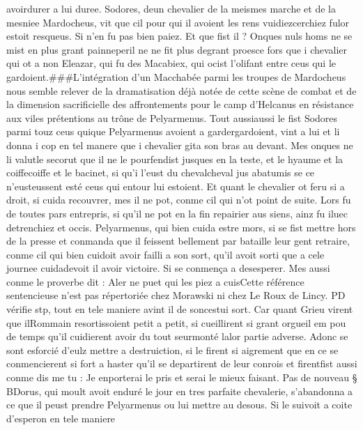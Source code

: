 \documentclass{article}
\begin{document}
\begin{pages}
   avoirdurer a lui duree. \pend
\pstart Sodores, 
   deun chevalier de la meismes marche et de la mesniee 
   Mardocheus, vit que cil pour qui il avoient les rens 
   vuidiezcerchiez 
   fulor estoit resqueus. Si n’en fu pas bien paiez. Et que fist il ? 
   Onques nuls homs ne se mist en plus grant painneperil ne ne fit plus 
   degrant proesce fors que i chevalier qui ot a non 
   Eleazar, qui fu des Macabiex, qui ocist l’olifant entre ceus qui le 
   gardoient.###L'intégration d'un Macchabée parmi les troupes de Mardocheus nous semble relever 
   de la dramatisation déjà notée de cette scène de combat et de la dimension sacrificielle des affrontements pour le camp 
   d'Helcanus en résistance aux viles prétentions au trône de Pelyarmenus. Tout 
   aussiaussi le fist Sodores
   parmi touz ceus quique Pelyarmenus 
   avoient a gardergardoient, vint a lui et li donna i cop en tel 
   manere que i chevalier gita son bras au devant. 
   Mes onques ne li valutle secorut que il ne le pourfendist jusques en la 
   teste, et le hyaume et la 
   coiffecoiffe et le bacinet, 
   si qu’i l’eust du chevalcheval jus 
   abatumis se 
   ce n’eusteussent 
   esté ceus qui entour lui estoient. Et quant le chevalier ot feru si a droit, si cuida recouvrer, 
   mes il ne pot, conme cil qui n’ot point de suite. Lors fu de toutes pars entrepris, si 
   qu’il ne pot en la fin repairier aus siens, ainz fu iluec detrenchiez et occis. \pend
\pstart Pelyarmenus, qui bien cuida estre mors, si se fist mettre hors 
   de la presse et conmanda que il feissent bellement par bataille leur gent retraire, conme cil qui bien cuidoit avoir failli a son sort, 
   qu’il avoit sorti que a cele journee cuidadevoit il avoir victoire. 
   Si se conmença a desesperer. Mes aussi conme le proverbe dit : 
   Aler ne puet qui les piez a cuisCette référence sentencieuse 
   n'est pas répertoriée chez Morawski ni chez Le Roux de Lincy. PD vérifie stp, 
   tout en tele maniere avint il de soncestui sort. Car quant 
   Grieu virent que ilRommain resortissoient petit a 
   petit, si cueillirent si grant orgueil em pou de temps qu’il cuidierent avoir du tout seurmonté 
   lalor partie adverse. Adonc se sont esforcié d’eulz mettre a destruiction, 
   si le firent si aigrement que en ce se conmencierent si fort a haster qu’il se departirent de leur conrois et 
   firentfist aussi conme dis me tu :
   Je enporterai le pris et serai le mieux faisant. \pend
\pstart Pas de nouveau § BDorus, 
   qui moult avoit enduré le jour en tres parfaite chevalerie, s’abandonna a ce que il peust prendre 
   Pelyarmenus ou lui mettre au desous. Si le suivoit a coite d’esperon en tele maniere 

\end{pages}
\end{document}
